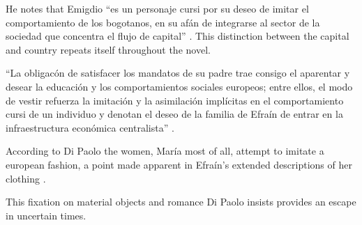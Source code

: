 \documentclass[12pt]{article}
\begin{document}
He notes that Emigdio \enquote{es un personaje cursi por su deseo de imitar el comportamiento de los bogotanos, en su afán de integrarse al sector de la sociedad que concentra el flujo de capital} \cite[9]{Paolo}. This distinction between the capital and country repeats itself throughout the novel.

\enquote{La obligacón de satisfacer los mandatos de su padre trae consigo el aparentar y desear la educación y los comportamientos sociales europeos; entre ellos, el modo de vestir refuerza la imitación y la asimilación implícitas en el comportamiento cursi de un individuo y denotan el deseo de la familia de Efraín de entrar en la infraestructura económica centralista} \cite[9]{Paolo}.

According to Di Paolo the women, María most of all, attempt to imitate a european fashion, a point made apparent in Efraín's extended descriptions of her clothing \cite[9]{Paolo}.

This fixation on material objects and romance Di Paolo insists provides an escape in uncertain times. 
\end{document}
